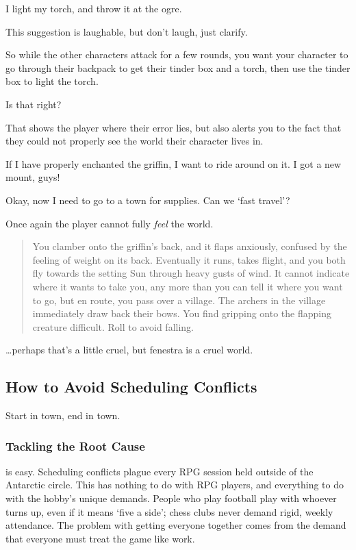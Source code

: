 \begin{multicols}{2}
\begin{boxtext}
  I light my torch, and throw it at the ogre.
\end{boxtext}

This suggestion is laughable, but don't laugh, just clarify.

\begin{speechtext}
  So while the other characters attack for a few rounds, you want your character to go through their backpack to get their tinder box and a torch, then use the tinder box to light the torch.

  Is that right?
\end{speechtext}

That shows the player where their error lies, but also alerts you to the fact that they could not properly see the world their character lives in.

\begin{boxtext}
  If I have properly enchanted the griffin, I want to ride around on it.
  I got a new mount, guys!

  Okay, now I need to go to a town for supplies.
  Can we `fast travel'?
\end{boxtext}

Once again the player cannot fully \emph{feel} the world.

\null
\begin{quote}
  You clamber onto the griffin's back, and it flaps anxiously, confused by the feeling of weight on its back.
  Eventually it runs, takes flight, and you both fly towards the setting Sun through heavy gusts of wind.
  It cannot indicate where it wants to take you, any more than you can tell it where you want to go, but en route, you pass over a \gls{village}.
  The archers in the \gls{village} immediately draw back their bows.
  You find gripping onto the flapping creature difficult.
  Roll  to avoid falling.
\end{quote}

\ldots perhaps that's a little cruel, but \gls{fenestra} is a cruel world.

\subsection{How to Avoid Scheduling Conflicts}

Start in town, end in town.

\subsubsection{Tackling the Root Cause}
is easy.
Scheduling conflicts plague every RPG session held outside of the Antarctic circle.
This has nothing to do with RPG players, and everything to do with the hobby's unique demands.
People who play football play with whoever turns up, even if it means `five a side'; chess clubs never demand rigid, weekly attendance.
The problem with getting everyone together comes from the demand that everyone must treat the game like work.


\end{multicols}
